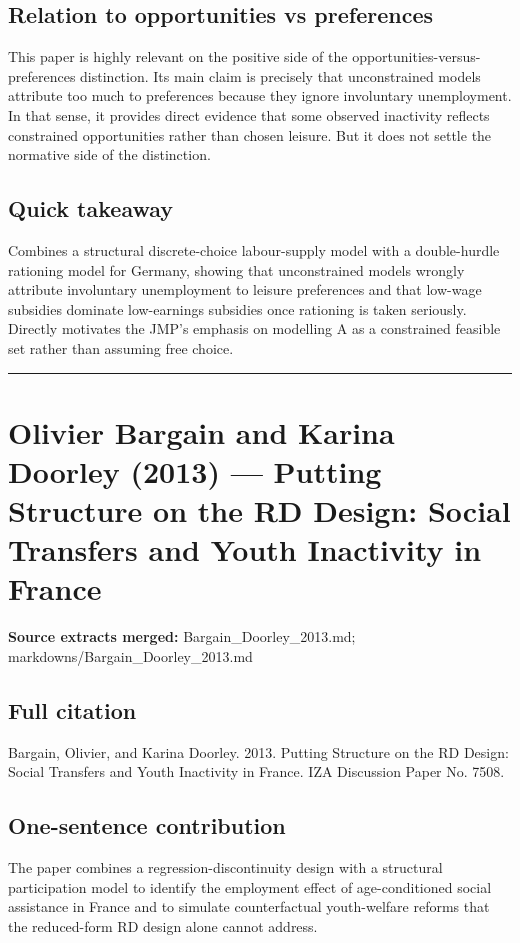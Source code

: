 \documentclass[11pt,a4paper]{article}
\begin{document}
\subsection*{Relation to opportunities vs preferences}
This paper is highly relevant on the positive side of the opportunities-versus-preferences distinction. Its main claim is precisely that unconstrained models attribute too much to preferences because they ignore involuntary unemployment. In that sense, it provides direct evidence that some observed inactivity reflects constrained opportunities rather than chosen leisure. But it does not settle the normative side of the distinction.

\subsection*{Quick takeaway}
Combines a structural discrete-choice labour-supply model with a double-hurdle rationing model for Germany, showing that unconstrained models wrongly attribute involuntary unemployment to leisure preferences and that low-wage subsidies dominate low-earnings subsidies once rationing is taken seriously. Directly motivates the JMP's emphasis on modelling A as a constrained feasible set rather than assuming free choice.


\medskip\hrule\medskip

\section*{Olivier Bargain and Karina Doorley (2013) — Putting Structure on the RD Design: Social Transfers and Youth Inactivity in France}

\textbf{Source extracts merged:} Bargain\_Doorley\_2013.md; markdowns/Bargain\_Doorley\_2013.md

\subsection*{Full citation}
Bargain, Olivier, and Karina Doorley. 2013. Putting Structure on the RD Design: Social Transfers and Youth Inactivity in France. IZA Discussion Paper No. 7508.

\subsection*{One-sentence contribution}
The paper combines a regression-discontinuity design with a structural participation model to identify the employment effect of age-conditioned social assistance in France and to simulate counterfactual youth-welfare reforms that the reduced-form RD design alone cannot address.
\end{document}
